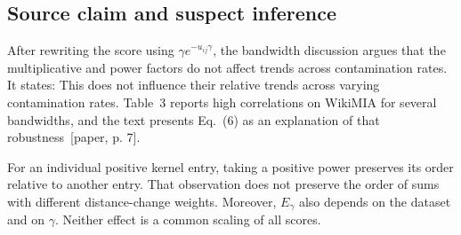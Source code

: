 \documentclass[10pt]{article}
\begin{document}
\subsection*{Source claim and suspect inference}
After rewriting the score using \(\gamma e^{-u_{ij}\gamma}\), the bandwidth discussion argues that the multiplicative and power factors do not affect trends across contamination rates. It states: This does not influence their relative trends across varying contamination rates. Table 3 reports high correlations on WikiMIA for several bandwidths, and the text presents Eq. (6) as an explanation of that robustness [paper, p. 7].\par
For an individual positive kernel entry, taking a positive power preserves its order relative to another entry. That observation does not preserve the order of sums with different distance-change weights. Moreover, \(E_\gamma\) also depends on the dataset and on \(\gamma\). Neither effect is a common scaling of all scores.\par
\end{document}
